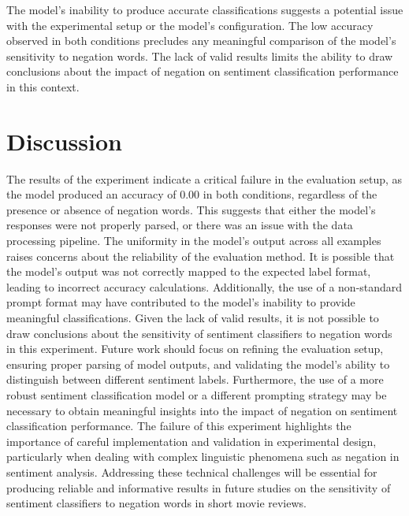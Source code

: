\documentclass{article}
\begin{document}
The model's inability to produce accurate classifications suggests a potential issue with the experimental setup or the model's configuration. The low accuracy observed in both conditions precludes any meaningful comparison of the model's sensitivity to negation words. The lack of valid results limits the ability to draw conclusions about the impact of negation on sentiment classification performance in this context.
\section{Discussion}
The results of the experiment indicate a critical failure in the evaluation setup, as the model produced an accuracy of 0.00 in both conditions, regardless of the presence or absence of negation words. This suggests that either the model's responses were not properly parsed, or there was an issue with the data processing pipeline. The uniformity in the model's output across all examples raises concerns about the reliability of the evaluation method. It is possible that the model's output was not correctly mapped to the expected label format, leading to incorrect accuracy calculations. Additionally, the use of a non-standard prompt format may have contributed to the model's inability to provide meaningful classifications. Given the lack of valid results, it is not possible to draw conclusions about the sensitivity of sentiment classifiers to negation words in this experiment. Future work should focus on refining the evaluation setup, ensuring proper parsing of model outputs, and validating the model's ability to distinguish between different sentiment labels. Furthermore, the use of a more robust sentiment classification model or a different prompting strategy may be necessary to obtain meaningful insights into the impact of negation on sentiment classification performance. The failure of this experiment highlights the importance of careful implementation and validation in experimental design, particularly when dealing with complex linguistic phenomena such as negation in sentiment analysis. Addressing these technical challenges will be essential for producing reliable and informative results in future studies on the sensitivity of sentiment classifiers to negation words in short movie reviews.
\end{document}
